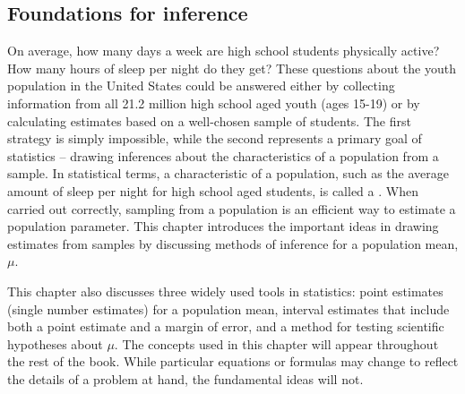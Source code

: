 
\begin{spacing}{1.5}

\chapter{Foundations for inference}
\label{foundationsForInference}

On average, how many days a week are high school students physically active? How many hours of sleep per night do they get? These questions about the youth population in the United States could be answered either by collecting information from all 21.2 million high school aged youth (ages 15-19) or by calculating  estimates based on a well-chosen sample of students. The first strategy is simply impossible, while the second represents a primary goal of statistics -- drawing inferences about the characteristics of a population from a sample. In statistical terms, a characteristic of a population, such as the average amount of sleep per night for high school aged students, is called a . When carried out correctly, sampling from a population is an efficient way to estimate a population parameter. This chapter introduces the important ideas in drawing estimates from samples by discussing methods of inference for a population mean, $\mu$. 

This chapter also discusses three widely used tools in statistics: point estimates (single number estimates) for a population mean, interval estimates that include both a point estimate and a margin of error, and a method for testing scientific hypotheses about $\mu$. The concepts used in this chapter will appear throughout the rest of the book. While particular equations or formulas may change to reflect the details of a problem at hand, the fundamental ideas will not. 



\end{spacing}

